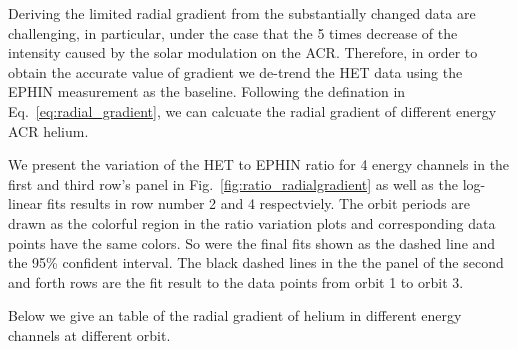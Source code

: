 Deriving the limited radial gradient from the substantially changed data are challenging, in particular, under the case that the 5 times decrease of the intensity caused by the solar modulation on the \ac{ACR}.
Therefore, in order to obtain the accurate value of gradient we de-trend the \ac{HET} data using the \ac{EPHIN} measurement as the baseline. Following the defination in Eq.~\ref{eq:radial_gradient}, we can calcuate the radial gradient of different energy \ac{ACR} helium.

We present the variation of the \ac{HET} to \ac{EPHIN} ratio for 4 energy channels in the first and third row's panel in Fig.~\ref{fig:ratio_radialgradient} as well as the log-linear fits results in row number 2 and 4 respectviely. The orbit periods are drawn as the colorful region in the ratio variation plots and corresponding data points have the same colors. So were the final fits shown as the dashed line and the 95\% confident interval. The black dashed lines in the the panel of the second and forth rows are the fit result to the data points from orbit 1 to orbit 3.

Below we give an table of the radial gradient of helium in different energy channels at different orbit.

\begin{table}


\end{table}

